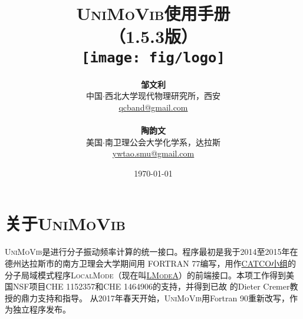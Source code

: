 \documentclass[12pt,a4paper,openany,twoside,cap,UTF8]{ctexbook}
\begin{document}

\title{
\vspace{-3cm}
\hei\textsc{UniMoVib}使用手册  \\
\vspace{1cm} （1.5.3版）\vspace{20 mm} \\
\texttt{[image: fig/logo]} \vspace{10 mm}}

\author{
\textbf{邹文利} \\
中国$\cdot$西北大学现代物理研究所，西安  \\
\href{mailto:qcband@gmail.com}{qcband@gmail.com}
\\ \\
\textbf{陶韵文} \\
美国$\cdot$南卫理公会大学化学系，达拉斯  \\
\href{mailto:ywtao.smu@gmail.com}{ywtao.smu@gmail.com}
}

\date{\vspace{1cm}  \today}
\maketitle

\setcounter{page}{1}   %
\renewcommand\contentsname{目\qquad 录}
\makeatletter
\let\ps@plain\ps@empty
\makeatother
\tableofcontents            %

\mainmatter
\chapter{关于\textsc{UniMoVib}}
\label{part:about}

\textsc{UniMoVib}是进行分子振动频率计算的统一接口。程序最初是我于2014至2015年在德州达拉斯市的南方卫理会大学期间用 FORTRAN 77编写，用作\href{https://sites.smu.edu/dedman/catco/}{CATCO小组}的分子局域模式程序\textsc{LocalMode}（现在叫\href{https://sites.smu.edu/dedman/catco/}{\textsc{LModeA}}）的前端接口。本项工作得到美国NSF项目CHE 1152357和CHE 1464906的支持，并得到已故 的Dieter Cremer教授的鼎力支持和指导。
从2017年春天开始，\textsc{UniMoVib}用Fortran 90重新改写，作为独立程序发布。
\end{document}
